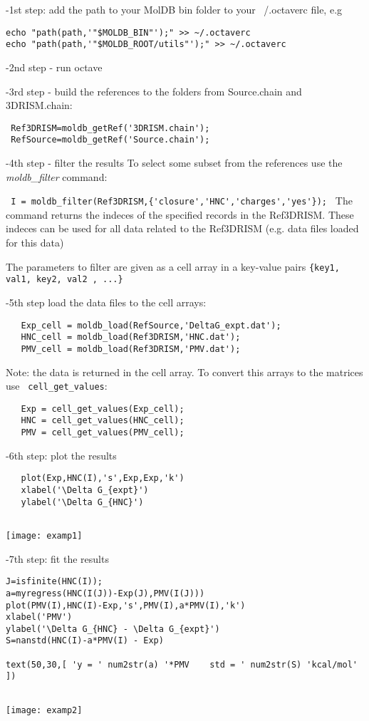 \documentclass[12pt]{article}
\begin{document}
-1st  step: add the path to your MolDB bin folder to your ~/.octaverc file, e.g

\begin{verbatim}
echo "path(path,'"$MOLDB_BIN"');" >> ~/.octaverc
echo "path(path,'"$MOLDB_ROOT/utils"');" >> ~/.octaverc
\end{verbatim}

-2nd step - run octave

-3rd step - build the references to the folders from Source.chain and 3DRISM.chain:

\begin{verbatim}
 Ref3DRISM=moldb_getRef('3DRISM.chain');
 RefSource=moldb_getRef('Source.chain');
\end{verbatim}

-4th step - filter the results
To select some subset from the references use the \emph{moldb\_filter} command:

\verb$ I = moldb_filter(Ref3DRISM,{'closure','HNC','charges','yes'}); $
The command returns the indeces of the specified records in the Ref3DRISM. 
These indeces can be used for all data related to the Ref3DRISM (e.g. data files loaded for this data)


The parameters to filter are given as a cell array in a key-value pairs \verb#{key1, val1, key2, val2 , ...}#

-5th step
 load the data files to the cell arrays:
 \begin{verbatim}
   Exp_cell = moldb_load(RefSource,'DeltaG_expt.dat');
   HNC_cell = moldb_load(Ref3DRISM,'HNC.dat');
   PMV_cell = moldb_load(Ref3DRISM,'PMV.dat');
 \end{verbatim}
 
 Note: the data is returned in the cell array.
 To convert this arrays to the matrices use \verb# cell_get_values#:
 \begin{verbatim}
   Exp = cell_get_values(Exp_cell);
   HNC = cell_get_values(HNC_cell);
   PMV = cell_get_values(PMV_cell);
 \end{verbatim}
 
-6th step: 
  plot the results
  
 \begin{verbatim}
   plot(Exp,HNC(I),'s',Exp,Exp,'k')
   xlabel('\Delta G_{expt}')
   ylabel('\Delta G_{HNC}')
  
 \end{verbatim}
   
 \texttt{[image: examp1]}

-7th step: 
fit the results

\begin{verbatim}
J=isfinite(HNC(I));
a=myregress(HNC(I(J))-Exp(J),PMV(I(J)))
plot(PMV(I),HNC(I)-Exp,'s',PMV(I),a*PMV(I),'k')
xlabel('PMV')
ylabel('\Delta G_{HNC} - \Delta G_{expt}')
S=nanstd(HNC(I)-a*PMV(I) - Exp)

text(50,30,[ 'y = ' num2str(a) '*PMV    std = ' num2str(S) 'kcal/mol' ])
 
\end{verbatim}

 \texttt{[image: examp2]}
\end{document}
